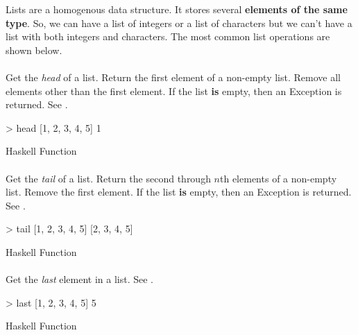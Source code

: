 Lists are a homogenous data structure.
It stores several \textbf{elements of the same type}.
So, we can have a list of integers or a list of characters but we can't have a list with both integers and characters.
The most common list operations are shown below.

\paragraph{\texorpdfstring{}{\texttt{head}}}\label{par:List_Head_Function}
Get the \emph{head} of a list. Return the first element of a non-empty list. Remove all elements other than the first element.
If the list \textbf{is} empty, then an Exception is returned.
See .
\begin{listing}[h!tbp]
\begin{haskellsource}
  > head [1, 2, 3, 4, 5]
  1
\end{haskellsource}
\caption{Haskell  Function}
\label{lst:List_Head_Function}
\end{listing}

\paragraph{\texorpdfstring{}{\texttt{tail}}}\label{par:List_Tail_Function}
Get the \emph{tail} of a list. Return the second through $n$th elements of a non-empty list. Remove the first element.
If the list \textbf{is} empty, then an Exception is returned.
See .
\begin{listing}[h!tbp]
\begin{haskellsource}
  > tail [1, 2, 3, 4, 5]
  [2, 3, 4, 5]
\end{haskellsource}
\caption{Haskell  Function}
\label{lst:List_Tail_Function}
\end{listing}

\paragraph{\texorpdfstring{}{\texttt{last}}}\label{par:List_Last_Function}
Get the \emph{last} element in a list.
See .
\begin{listing}[h!tbp]
\begin{haskellsource}
  > last [1, 2, 3, 4, 5]
  5
\end{haskellsource}
\caption{Haskell  Function}
\label{lst:List_Last_Function}
\end{listing}

